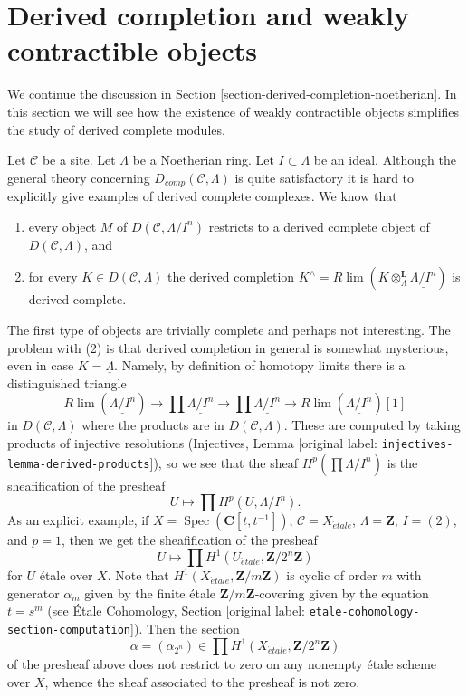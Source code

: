 \documentclass[10pt,a4paper]{article}
\theoremstyle{plain}
\theoremstyle{definition}
\theoremstyle{remark}
\numberwithin{equation}{subsection}
\def\lim{\mathop{\mathrm{lim}}\nolimits}
\def\Spec{\mathop{\mathrm{Spec}}}
\def\etale{{\acute{e}tale}}
\begin{document}
\section{Derived completion and weakly contractible objects}
\label{section-derived-completion-proetale}

\noindent
We continue the discussion in
Section \ref{section-derived-completion-noetherian}.
In this section we will see how the existence of
weakly contractible objects simplifies the study
of derived complete modules.

\medskip\noindent
Let $\mathcal{C}$ be a site. Let $\Lambda$ be a Noetherian ring.
Let $I \subset \Lambda$ be an ideal. Although the general theory
concerning $D_{comp}(\mathcal{C}, \Lambda)$ is quite satisfactory
it is hard to explicitly give examples of derived complete complexes.
We know that
\begin{enumerate}
\item every object $M$ of $D(\mathcal{C}, \Lambda/I^n)$ restricts to a
derived complete object of $D(\mathcal{C}, \Lambda)$, and
\item for every $K \in D(\mathcal{C}, \Lambda)$ the derived completion
$K^\wedge = R\lim (K \otimes_\Lambda^\mathbf{L} \underline{\Lambda/I^n})$
is derived complete.
\end{enumerate}
The first type of objects are trivially complete and perhaps not
interesting. The problem with (2) is that derived completion
in general is somewhat mysterious, even in case $K = \underline{\Lambda}$.
Namely, by definition of homotopy limits there
is a distinguished triangle
$$
R\lim(\underline{\Lambda/I^n}) \to
\prod \underline{\Lambda/I^n} \to
\prod \underline{\Lambda/I^n} \to
R\lim(\underline{\Lambda/I^n})[1]
$$
in $D(\mathcal{C}, \Lambda)$ where the products are in
$D(\mathcal{C}, \Lambda)$. These are computed by taking products
of injective resolutions
(Injectives, Lemma \textnormal{[original label: \nolinkurl{injectives-lemma-derived-products}]}),
so we see that the sheaf $H^p(\prod \underline{\Lambda/I^n})$
is the sheafification of the presheaf
$$
U \longmapsto \prod H^p(U, \Lambda/I^n).
$$
As an explicit example, if $X = \Spec(\mathbf{C}[t, t^{-1}])$,
$\mathcal{C} = X_\etale$, $\Lambda = \mathbf{Z}$, $I = (2)$, and
$p = 1$, then we get the sheafification of the presheaf
$$
U \mapsto \prod H^1(U_\etale, \mathbf{Z}/2^n\mathbf{Z})
$$
for $U$ \'etale over $X$. Note that $H^1(X_\etale, \mathbf{Z}/m\mathbf{Z})$
is cyclic of order $m$ with generator $\alpha_m$ given by the finite \'etale
$\mathbf{Z}/m\mathbf{Z}$-covering given by the equation $t = s^m$
(see \'Etale Cohomology, Section \textnormal{[original label: \nolinkurl{etale-cohomology-section-computation}]}).
Then the section
$$
\alpha = (\alpha_{2^n}) \in \prod H^1(X_\etale, \mathbf{Z}/2^n\mathbf{Z})
$$
of the presheaf above does not restrict to zero on any nonempty \'etale
scheme over $X$, whence the sheaf associated to the presheaf is not zero.
\end{document}
